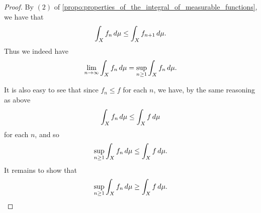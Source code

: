 \documentclass[notoc,notitlepage]{tufte-book}
\begin{document}
\begin{proof}
  By $(2)$ of \cref{propo:properties_of_the_integral_of_measurable_functions},
  we have that
  \begin{equation*}
    \int_{X} f_n \mathop{}\!d{\mu} \leq \int_{X} f_{n+1} \mathop{}\!d{\mu}.
  \end{equation*}
  Thus we indeed have
  \begin{equation*}
    \lim_{n \to \infty} \int_{X} f_n \mathop{}\!d{\mu}
    = \sup_{n \geq 1} \int_{X} f_n \mathop{}\!d{\mu}.
  \end{equation*}

  It is also easy to see that since $f_n \leq f$ for each $n$,
  we have, by the same reasoning as above
  \begin{equation*}
    \int_{X} f_n \mathop{}\!d{\mu} \leq \int_{X} f \mathop{}\!d{\mu}
  \end{equation*}
  for each $n$, and so
  \begin{equation*}
    \sup_{n \geq 1} \int_{X} f_n \mathop{}\!d{\mu} \leq \int_{X} f \mathop{}\!d{\mu}.
  \end{equation*}
  It remains to show that 
  \begin{equation*}
    \sup_{n \geq 1} \int_{X} f_n \mathop{}\!d{\mu} \geq \int_{X} f \mathop{}\!d{\mu}.
  \end{equation*}


\end{proof}
\end{document}
